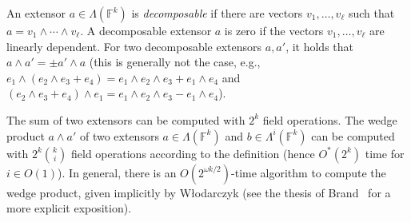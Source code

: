 \documentclass{theoretics}
\newcommand{\F}{\ensuremath{\mathbb F}\xspace}
\begin{document}
An extensor $a \in \Lambda(\F^k)$ is \emph{decomposable} if there are vectors $v_1, \dots, v_{\ell}$ such that $a = v_1 \wedge \cdots \wedge v_{\ell}$.
A decomposable extensor $a$ is zero if the vectors $v_1, \dots, v_{\ell}$ are linearly dependent.
For two decomposable extensors $a, a'$, it holds that $a \wedge a' = \pm a' \wedge a$ (this is generally not the case, e.g., $e_1 \wedge (e_2 \wedge e_3 +  e_4) = e_1 \wedge e_2 \wedge e_3 + e_1 \wedge e_4$ and $(e_2 \wedge e_3 +  e_4) \wedge e_1 = e_1 \wedge e_2 \wedge e_3 - e_1 \wedge e_4$).

The sum of two extensors can be computed with $2^{k}$ field operations.
The wedge product $a \wedge a'$ of two extensors $a \in \Lambda(\F^k)$ and $b \in \Lambda^i(\F^k)$ can be computed with $2^k \binom{k}{i}$ field operations according to the definition (hence $O^*(2^k)$ time for $i \in O(1)$).
In general, there is an $O(2^{\omega k / 2})$-time algorithm to compute the wedge product, given implicitly by W\l{}odarczyk \cite{Wlodarczyk19} (see the thesis of Brand~\cite{Brand19thesis} for a more explicit exposition).
\end{document}
